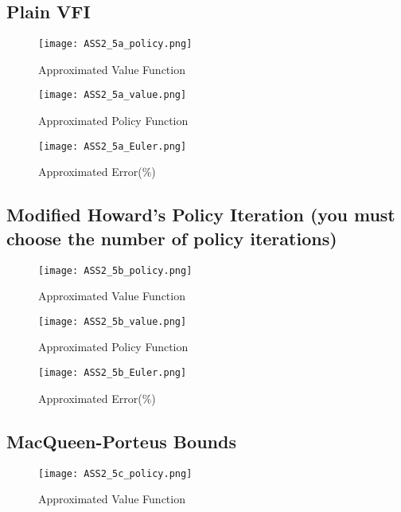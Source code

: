 \documentclass[12pt,a4paper]{article}
\begin{document}
\subsection{Plain VFI}

\begin{figure}[!htbp]
\centering
  \texttt{[image: ASS2\_5a\_policy.png]}
  \caption{Approximated Value Function}
  \label{fig:boat1}
\end{figure}
\pagebreak  

\begin{figure}[!htbp]
\centering
  \texttt{[image: ASS2\_5a\_value.png]}
  \caption{Approximated Policy Function}
  \label{fig:boat1}
\end{figure}

\begin{figure}[!htbp]
\centering
  \texttt{[image: ASS2\_5a\_Euler.png]}
  \caption{Approximated Error($\%$)}
  \label{fig:boat1}
\end{figure}

\subsection{Modified Howard’s Policy Iteration (you must choose the number of policy iterations)}

\pagebreak
\begin{figure}[!htbp]
\centering
  \texttt{[image: ASS2\_5b\_policy.png]}
  \caption{Approximated Value Function}
  \label{fig:boat1}
\end{figure}

\begin{figure}[!htbp]
\centering
  \texttt{[image: ASS2\_5b\_value.png]}
  \caption{Approximated Policy Function}
  \label{fig:boat1}
\end{figure}
\pagebreak

\pagebreak
\begin{figure}[!htbp]
\centering
  \texttt{[image: ASS2\_5b\_Euler.png]}
  \caption{Approximated Error($\%$)}
  \label{fig:boat1}
\end{figure}

\subsection{MacQueen-Porteus Bounds}
\begin{figure}[!htbp]
\centering
  \texttt{[image: ASS2\_5c\_policy.png]}
  \caption{Approximated Value Function}
  \label{fig:boat1}
\end{figure}
\end{document}
